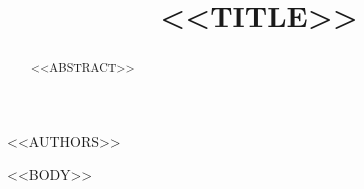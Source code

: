 \documentclass[twocolumn]{aastex701}
\begin{document}
\title{<<TITLE>>}

<<AUTHORS>>

\begin{abstract}
<<ABSTRACT>>
\end{abstract}


<<BODY>>



\end{document}
